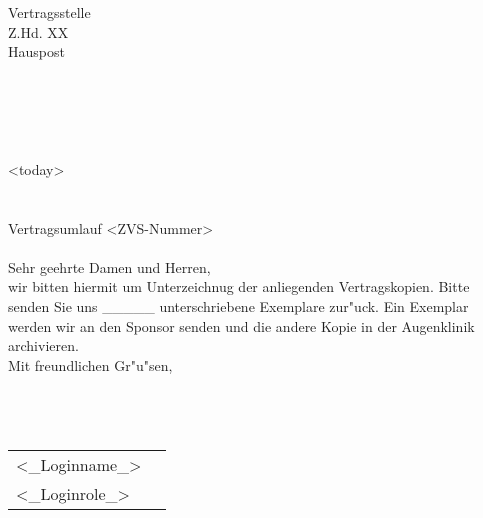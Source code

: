 \documentclass{scrreprt}
\begin{document}
\baselineskip15pt
\setlength{\headheight}{7\baselineskip}
\setlength{\oddsidemargin}{-3mm} 
\addtolength{\textwidth}{2cm}

\noindent Vertragsstelle\\
\noindent Z.Hd. XX\\
\noindent Hauspost \\
\noindent \\
\\ \\ 
\\ \\ 

\hspace{12.5cm} <today>\\ \\ \\ 

\noindent Vertragsumlauf <ZVS-Nummer>\\ \\

\noindent  Sehr geehrte Damen und Herren,\\

\noindent wir bitten hiermit um Unterzeichnug der anliegenden Vertragskopien. Bitte senden Sie uns \_\_\_\_\_ unterschriebene Exemplare zur"uck. Ein Exemplar werden wir an den Sponsor senden und die andere Kopie in der Augenklinik archivieren.\\

\noindent Mit freundlichen Gr"u"sen, \\ \\   \\ \\

\hspace*{-7mm}  \begin{tabularx}{20cm}{XX}
<_Loginname_>\\ 
<_Loginrole_> \\ 
\end{tabularx}
\end{document}
